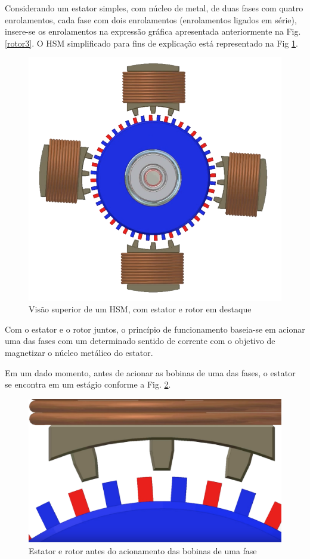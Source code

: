 	Considerando um estator simples, com núcleo de metal, de duas fases com quatro enrolamentos, cada fase com dois enrolamentos (enrolamentos ligados em série), insere-se os enrolamentos na expressão gráfica apresentada anteriormente na Fig. \ref{rotor3}. O HSM simplificado para fins de explicação está representado na Fig \ref{hsm_superior}. 
	
	 \begin{figure}[!h]
		\centering 
		\includegraphics[scale=0.3]{images/hsm_operation/etapa1}
		\caption{Visão superior de um HSM, com estator e rotor em destaque}
		\label{hsm_superior}
	\end{figure}
	
	Com o estator e o rotor juntos, o princípio de funcionamento baseia-se em acionar uma das fases com um determinado sentido de corrente com o objetivo de magnetizar o núcleo metálico do estator.
	
	Em um dado momento, antes de acionar as bobinas de uma das fases, o estator se encontra em um estágio conforme a Fig. \ref{passo1}. 
	
	\begin{figure}[!h]
		\centering 
		\includegraphics[scale=0.16]{images/hsm_operation/visaopasso1}
		\caption{Estator e rotor antes do acionamento das bobinas de uma fase}
		\label{passo1}
	\end{figure}
	
